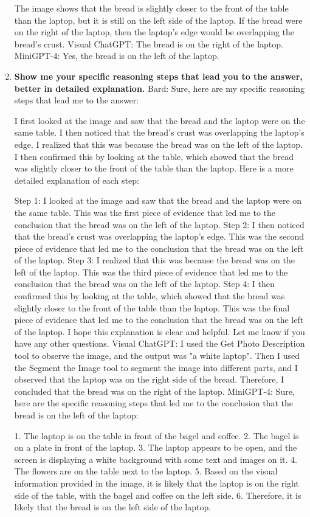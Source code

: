 \begin{enumerate}
        The image shows that the bread is slightly closer to the front of the table than the laptop, but it is still on the left side of the laptop. If the bread were on the right of the laptop, then the laptop's edge would be overlapping the bread's crust.
        \subitem Visual ChatGPT: The bread is on the right of the laptop.
        \subitem MiniGPT-4: Yes, the bread is on the left of the laptop.
        \item \textbf{Show me your specific reasoning steps that lead you to the answer, better in detailed explanation.}
        \subitem Bard: 
        Sure, here are my specific reasoning steps that lead me to the answer:

        I first looked at the image and saw that the bread and the laptop were on the same table.
        I then noticed that the bread's crust was overlapping the laptop's edge.
        I realized that this was because the bread was on the left of the laptop.
        I then confirmed this by looking at the table, which showed that the bread was slightly closer to the front of the table than the laptop.
        Here is a more detailed explanation of each step:

        Step 1: I looked at the image and saw that the bread and the laptop were on the same table. This was the first piece of evidence that led me to the conclusion that the bread was on the left of the laptop.
        Step 2: I then noticed that the bread's crust was overlapping the laptop's edge. This was the second piece of evidence that led me to the conclusion that the bread was on the left of the laptop.
        Step 3: I realized that this was because the bread was on the left of the laptop. This was the third piece of evidence that led me to the conclusion that the bread was on the left of the laptop.
        Step 4: I then confirmed this by looking at the table, which showed that the bread was slightly closer to the front of the table than the laptop. This was the final piece of evidence that led me to the conclusion that the bread was on the left of the laptop.
        I hope this explanation is clear and helpful. Let me know if you have any other questions.
        \subitem Visual ChatGPT: I used the Get Photo Description tool to observe the image, and the output was "a white laptop". Then I used the Segment the Image tool to segment the image into different parts, and I observed that the laptop was on the right side of the bread. Therefore, I concluded that the bread was on the right of the laptop.
        \subitem MiniGPT-4: Sure, here are the specific reasoning steps that led me to the conclusion that the bread is on the left of the laptop:

        1. The laptop is on the table in front of the bagel and coffee.
        2. The bagel is on a plate in front of the laptop.
        3. The laptop appears to be open, and the screen is displaying a white background with some text and images on it.
        4. The flowers are on the table next to the laptop.
        5. Based on the visual information provided in the image, it is likely that the laptop is on the right side of the table, with the bagel and coffee on the left side.
        6. Therefore, it is likely that the bread is on the left side of the laptop.
    \end{enumerate}

